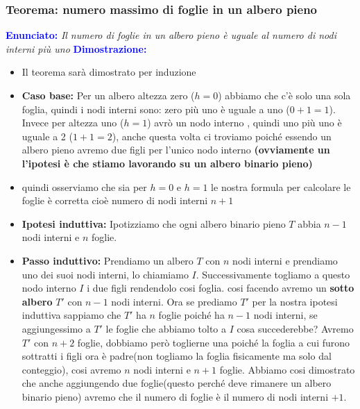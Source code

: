 \subsubsection{Teorema: numero massimo di foglie in un albero pieno}
\textbf{\textcolor{blue}{Enunciato:}}\newline
\textit{Il numero di foglie in un albero pieno è uguale al numero di nodi interni più uno}\newline\newline
\newpage
\textbf{\textcolor{blue}{Dimostrazione:}}
\begin{itemize}
    \item Il teorema sarà dimostrato per induzione
    \item  \textbf{Caso base:} Per un albero altezza zero ($h = 0$) abbiamo che c'è solo una sola foglia, quindi i nodi interni sono: zero più uno è uguale a uno ($0+1 = 1$). Invece per altezza uno ($h = 1$) avrò un nodo interno , quindi uno più uno è uguale a 2 ($1+1 =2$), anche questa volta ci troviamo poiché essendo un albero pieno avremo due figli per l'unico nodo interno \textbf{(ovviamente un l'ipotesi è che stiamo lavorando su un albero binario pieno)}
    \item quindi osserviamo che sia per $h=0$ e $h = 1$ le nostra formula per calcolare le foglie è corretta cioè numero di nodi interni $n + 1$
    \item  \textbf{Ipotesi induttiva:} Ipotizziamo che ogni albero binario pieno $T$ abbia $n-1$ nodi interni e $n$ foglie.
    \item  \textbf{Passo induttivo:}
    Prendiamo un albero $T$ con $n$ nodi interni e prendiamo uno dei suoi nodi interni, lo chiamiamo $I$. Successivamente togliamo a questo nodo interno $I$ i due figli rendendolo cosi foglia. cosi facendo avremo un \textbf{sotto albero} $T'$ con $n-1$ nodi interni. Ora se prediamo $T'$ per la nostra ipotesi induttiva sappiamo che $T'$ ha $n$ foglie poiché ha $n-1$ nodi interni, se aggiungessimo a $T'$ le foglie che abbiamo tolto a $I$  cosa succederebbe? Avremo $T'$ con $n+2$ foglie, dobbiamo però toglierne una poiché la foglia a cui furono sottratti i figli ora è padre(non togliamo la foglia fisicamente ma solo dal conteggio), cosi avremo $n$ nodi interni e $n+1$ foglie. Abbiamo cosi dimostrato che anche aggiungendo due foglie(questo perché deve rimanere un albero binario pieno) avremo che il numero di foglie è il numero di nodi interni $+ 1$.
    
\end{itemize}
